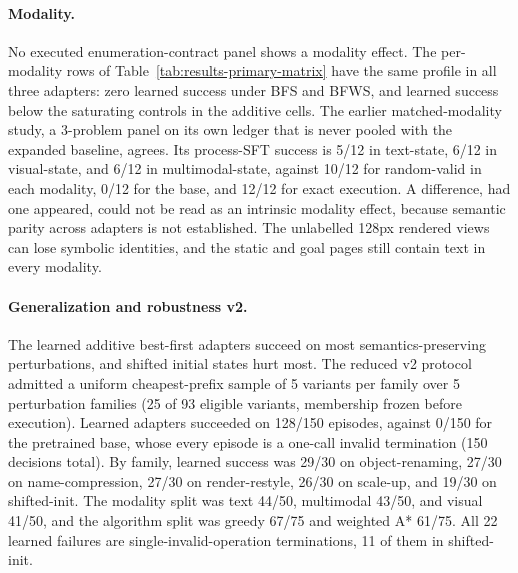 \paragraph{Modality.} No executed enumeration-contract panel shows a modality effect. The per-modality rows of Table~\ref{tab:results-primary-matrix} have the same profile in all three adapters: zero learned success under BFS and BFWS, and learned success below the saturating controls in the additive cells. The earlier matched-modality study, a 3-problem panel on its own ledger that is never pooled with the expanded baseline, agrees. Its process-SFT success is 5/12 in text-state, 6/12 in visual-state, and 6/12 in multimodal-state, against 10/12 for random-valid in each modality, 0/12 for the base, and 12/12 for exact execution. A difference, had one appeared, could not be read as an intrinsic modality effect, because semantic parity across adapters is not established. The unlabelled 128px rendered views can lose symbolic identities, and the static and goal pages still contain text in every modality.

\paragraph{Generalization and robustness v2.} The learned additive best-first adapters succeed on most semantics-preserving perturbations, and shifted initial states hurt most. The reduced v2 protocol admitted a uniform cheapest-prefix sample of 5 variants per family over 5 perturbation families (25 of 93 eligible variants, membership frozen before execution). Learned adapters succeeded on 128/150 episodes, against 0/150 for the pretrained base, whose every episode is a one-call invalid termination (150 decisions total). By family, learned success was 29/30 on object-renaming, 27/30 on name-compression, 27/30 on render-restyle, 26/30 on scale-up, and 19/30 on shifted-init. The modality split was text 44/50, multimodal 43/50, and visual 41/50, and the algorithm split was greedy 67/75 and weighted A* 61/75. All 22 learned failures are single-invalid-operation terminations, 11 of them in shifted-init. 

